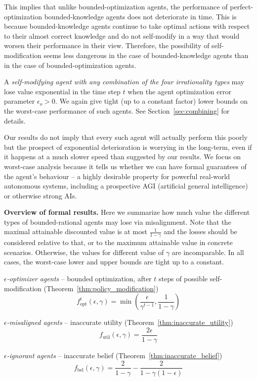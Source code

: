 This implies that unlike bounded-optimization agents, the performance of perfect-optimization bounded-knowledge agents does not deteriorate in time. This is because bounded-knowledge agents continue to take optimal actions with respect to their almost correct knowledge and do not self-modify in a way that would worsen their performance in their view. Therefore, the possibility of self-modification seems less dangerous in the case of bounded-knowledge agents than in the case of bounded-optimization agents.

\medskip
\noindent
A \emph{self-modifying agent with any combination of the four irrationality types} may lose value exponential in the time step $t$ when the agent optimization error parameter $\epsilon_o > 0$. We again give tight (up to a constant factor) lower bounds on the worst-case performance of such agents. See Section~\ref{sec:combining} for details.

\smallskip
Our results do not imply that every such agent will actually perform this poorly but the prospect of exponential deterioration is worrying in the long-term, even if it happens at a much slower speed than suggested by our results. We focus on worst-case analysis because it tells us whether we can have formal guarantees of the agent's behaviour -- a highly desirable property for powerful real-world autonomous systems, including a prospective AGI (artificial general intelligence) or otherwise strong AIs.

\medskip
\noindent
\textbf{Overview of formal results.} Here we summarize how much value the different types of bounded-rational agents may lose via misalignment. Note that the maximal attainable discounted value is at most $\frac{1}{1-\gamma}$ and the losses should be considered relative to that, or to the maximum attainable value in concrete scenarios. Otherwise, the values for different value of $\gamma$ are incomparable.
In all cases, the worst-case lower and upper bounds are tight up to a constant.

\medskip
\noindent
\emph{$\epsilon$-optimizer agents} -- bounded optimization, after $t$ steps of possible self-modification (Theorem~\ref{thm:policy_modification})
$$f^t_\text{opt}(\epsilon, \gamma) = \min(\frac{\epsilon}{\gamma^{t-1}}, \frac{1}{1-\gamma})$$ 

\medskip
\noindent
\emph{$\epsilon$-misaligned agents} -- inaccurate utility (Theorem~\ref{thm:inaccurate_utility})
$$f_\text{util}(\epsilon, \gamma) = \frac{2\epsilon}{1-\gamma}$$

\medskip
\noindent
\emph{$\epsilon$-ignorant agents} -- inaccurate belief (Theorem~\ref{thm:inaccurate_belief})
$$f_\text{bel}(\epsilon, \gamma) = \frac{2}{1-\gamma} - \frac{2}{1-\gamma(1-\epsilon)}$$

